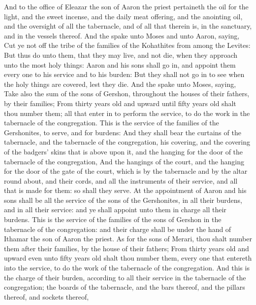 \begin{biblechapter}
\verse And to the office of Eleazar the son of Aaron the priest pertaineth the oil for the light, and the sweet incense, and the daily meat offering, and the anointing oil, and the oversight of all the tabernacle, and of all that therein is, in the sanctuary, and in the vessels thereof.
\verse And the \LORD spake unto Moses and unto Aaron, saying,
\verse Cut ye not off the tribe of the families of the Kohathites from among the Levites:
\verse But thus do unto them, that they may live, and not die, when they approach unto the most holy things: Aaron and his sons shall go in, and appoint them every one to his service and to his burden:
\verse But they shall not go in to see when the holy things are covered, lest they die.
 And the \LORD spake unto Moses, saying,
\verse Take also the sum of the sons of Gershon, throughout the houses of their fathers, by their families;
\verse From thirty years old and upward until fifty years old shalt thou number them; all that enter in to perform the service, to do the work in the tabernacle of the congregation.
\verse This is the service of the families of the Gershonites, to serve, and for burdens:
\verse And they shall bear the curtains of the tabernacle, and the tabernacle of the congregation, his covering, and the covering of the badgers' skins that is above upon it, and the hanging for the door of the tabernacle of the congregation,
\verse And the hangings of the court, and the hanging for the door of the gate of the court, which is by the tabernacle and by the altar round about, and their cords, and all the instruments of their service, and all that is made for them: so shall they serve.
\verse At the appointment of Aaron and his sons shall be all the service of the sons of the Gershonites, in all their burdens, and in all their service: and ye shall appoint unto them in charge all their burdens.
\verse This is the service of the families of the sons of Gershon in the tabernacle of the congregation: and their charge shall be under the hand of Ithamar the son of Aaron the priest.
 As for the sons of Merari, thou shalt number them after their families, by the house of their fathers;
\verse From thirty years old and upward even unto fifty years old shalt thou number them, every one that entereth into the service, to do the work of the tabernacle of the congregation.
\verse And this is the charge of their burden, according to all their service in the tabernacle of the congregation; the boards of the tabernacle, and the bars thereof, and the pillars thereof, and sockets thereof,

\end{biblechapter}
